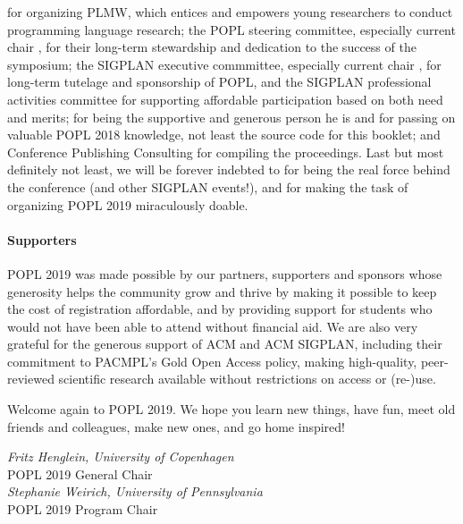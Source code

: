 for organizing PLMW, which entices and empowers young researchers to conduct programming language research;
%
the POPL steering committee, especially current
chair , for their  
long-term stewardship and dedication to the success
of the symposium;
%
the SIGPLAN executive commmittee, especially current chair , for long-term tutelage and sponsorship of POPL, and the SIGPLAN professional activities committee for supporting affordable participation based on both need and merits;
%
 for being the supportive and generous person he is
and 
 for passing on valuable POPL 2018 knowledge, not least the source code for this booklet;
%
%
%
%
 and Conference Publishing Consulting
for compiling the proceedings. 
%
%
Last but most definitely not least, we will be forever indebted to
for being the real force behind the conference
(and other SIGPLAN events!), and for making the
task of organizing POPL 2019 miraculously doable.

\paragraph{Supporters}
%
POPL 2019 was made possible by our partners, supporters
and sponsors whose generosity helps the community grow
and thrive by making it possible to keep the cost of
registration affordable, and by providing support for
students who would not have been able to attend without
financial aid.
%
We are also very grateful for the generous support of
ACM and ACM SIGPLAN, including their commitment to
PACMPL's Gold Open Access policy, making high-quality,
peer-reviewed scientific research available without
restrictions on access or (re-)use.

\medskip
Welcome again to POPL 2019. We hope you learn new things,
have fun, meet old friends and colleagues, make new
ones, and go home inspired!

\begin{flushright}
\textit{Fritz Henglein, University of Copenhagen} \\
POPL 2019 General Chair
\medskip \\
\textit{Stephanie Weirich, University of Pennsylvania} \\
POPL 2019 Program Chair
\medskip \\
\end{flushright}




\newpage
